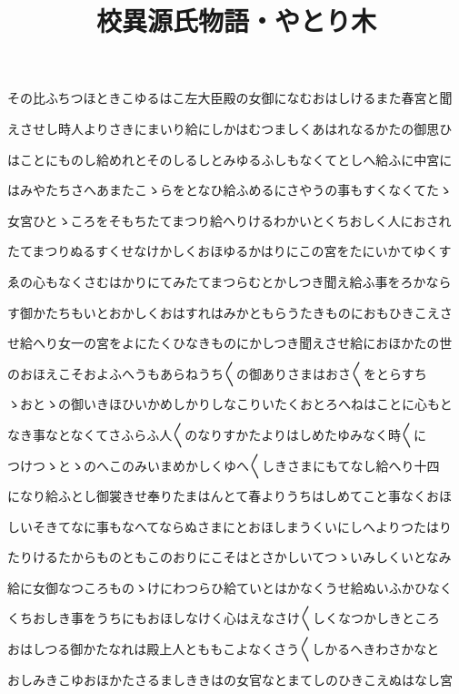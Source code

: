 \documentclass[a4paper,11pt,landscape]{ltjtarticle}
\title{校異源氏物語・やとり木}
\date{}
\begin{document}
\maketitle

その比ふちつほときこゆるはこ左大臣殿の女御になむおはしけるまた春宮と聞
\par\medskip
えさせし時人よりさきにまいり給にしかはむつましくあはれなるかたの御思ひ
\par\medskip
はことにものし給めれとそのしるしとみゆるふしもなくてとしへ給ふに中宮に
\par\medskip
はみやたちさへあまたこゝらをとなひ給ふめるにさやうの事もすくなくてたゝ
\par\medskip
女宮ひとゝころをそもちたてまつり給へりけるわかいとくちおしく人におされ
\par\medskip
たてまつりぬるすくせなけかしくおほゆるかはりにこの宮をたにいかてゆくす
\par\medskip
ゑの心もなくさむはかりにてみたてまつらむとかしつき聞え給ふ事をろかなら
\par\medskip
す御かたちもいとおかしくおはすれはみかともらうたきものにおもひきこえさ
\par\medskip
せ給へり女一の宮をよにたくひなきものにかしつき聞えさせ給におほかたの世
\par\medskip
のおほえこそおよふへうもあらねうち〱の御ありさまはおさ〱をとらすち
\par\medskip
ゝおとゝの御いきほひいかめしかりしなこりいたくおとろへねはことに心もと
\par\medskip
なき事なとなくてさふらふ人〱のなりすかたよりはしめたゆみなく時〱に
\par\medskip
つけつゝとゝのへこのみいまめかしくゆへ〱しきさまにもてなし給へり十四
\par\medskip
になり給ふとし御裳きせ奉りたまはんとて春よりうちはしめてこと事なくおほ
\par\medskip
しいそきてなに事もなへてならぬさまにとおほしまうくいにしへよりつたはり
\par\medskip
たりけるたからものともこのおりにこそはとさかしいてつゝいみしくいとなみ
\par\medskip
給に女御なつころものゝけにわつらひ給ていとはかなくうせ給ぬいふかひなく
\par\medskip
くちおしき事をうちにもおほしなけく心はえなさけ〱しくなつかしきところ
\par\medskip
おはしつる御かたなれは殿上人とももこよなくさう〱しかるへきわさかなと
\par\medskip
おしみきこゆおほかたさるましききはの女官なとまてしのひきこえぬはなし宮
\end{document}
